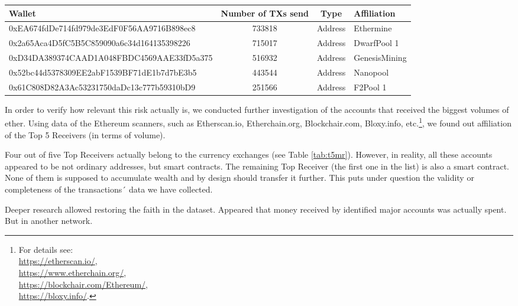 \begin{table}
\centering
{}
\label{tabt5ms}
\begin{adjustbox}{width=0.9\linewidth}
\begin{tabular}{p{7cm}ccl}
  \hline
Wallet & Number of TXs send & Type & Affiliation \\
  \hline
  0xEA674fdDe714fd979de3EdF0F56AA9716B898ec8 & 733818 & Address & Ethermine \\
  0x2a65Aca4D5fC5B5C859090a6c34d164135398226 & 715017 & Address & DwarfPool 1 \\
  0xD34DA389374CAAD1A048FBDC4569AAE33fD5a375 & 516932 & Address & GenesisMining \\
  0x52bc44d5378309EE2abF1539BF71dE1b7d7bE3b5 & 443544 & Address & Nanopool \\
  0x61C808D82A3Ac53231750daDc13c777b59310bD9 & 251566 & Address & F2Pool 1 \\
   \hline
\end{tabular}
\end{adjustbox}
\end{table}

In order to verify how relevant this risk actually is, we conducted further investigation of the accounts that received the biggest volumes of ether.  
Using data of the Ethereum scanners, such as Etherscan.io, Etherchain.org, Blockchair.com, Bloxy.info, etc.\footnote{For details see: \\ \url{https://etherscan.io/}, \\ \url{https://www.etherchain.org/}, \\ \url{https://blockchair.com/Ethereum/}, \\ \url{https://bloxy.info/}.}, we found out affiliation of the Top 5 Receivers (in terms of volume).

Four out of five Top Receivers actually belong to the currency exchanges (see Table \ref{tab:t5mr}).
However, in reality, all these accounts appeared to be not ordinary addresses, but smart contracts.
The remaining Top Receiver (the first one in the list) is also a smart contract.
None of them is supposed to accumulate wealth and by design should transfer it further.
This puts under question the validity or completeness of the transactions´ data we have collected.

Deeper research allowed restoring the faith in the dataset.
Appeared that money received by identified major accounts was actually spent.
But in another network.

